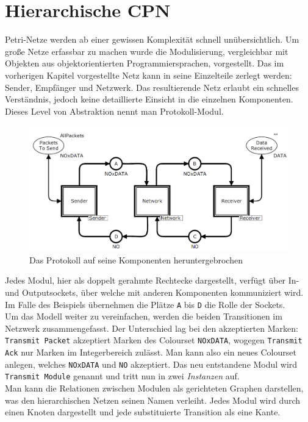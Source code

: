 \documentclass[11pt,onecolumn,a4paper,DIV=calc]{scrartcl}
\begin{document}
\section{Hierarchische CPN}
Petri-Netze werden ab einer gewissen Komplexität schnell unübersichtlich. Um große Netze erfassbar zu machen wurde die Modulisierung, vergleichbar mit Objekten aus objektorientierten Programmiersprachen, vorgestellt. Das im vorherigen Kapitel vorgestellte Netz kann in seine Einzelteile zerlegt werden: Sender, Empfänger und Netzwerk. Das resultierende Netz erlaubt ein schnelles Verständnis, jedoch keine detaillierte Einsicht in die einzelnen Komponenten. Dieses Level von Abstraktion nennt man Protokoll-Modul.
\begin{figure}[H]
    \centering
    \includegraphics[scale=0.4]{hier1.PNG}
    \caption{Das Protokoll auf seine Komponenten heruntergebrochen}
    \label{fig:Hier1}
\end{figure}
Jedes Modul, hier als doppelt gerahmte Rechtecke dargestellt, verfügt über In- und Outputsockets, über welche mit anderen Komponenten kommuniziert wird. Im Falle des Beispiels übernehmen die Plätze \texttt{A} bis \texttt{D} die Rolle der Sockets.\\
\newline
Um das Modell weiter zu vereinfachen, werden die beiden Transitionen im Netzwerk zusammengefasst. Der Unterschied lag bei den akzeptierten Marken: \texttt{Transmit Packet} akzeptiert Marken des Colourset \texttt{NOxDATA}, wogegen \texttt{Transmit Ack} nur Marken im Integerbereich zulässt. Man kann also ein neues Colourset anlegen, welches \texttt{NOxDATA} und \texttt{NO} akzeptiert. Das neu entstandene Modul wird \texttt{Transmit Module} genannt und tritt nun in zwei \textit{Instanzen} auf.\\
\newline
Man kann die Relationen zwischen Modulen als gerichteten Graphen darstellen, was den hierarchischen Netzen seinen Namen verleiht. Jedes Modul wird durch einen Knoten dargestellt und jede substituierte Transition als eine Kante. 
\end{document}
